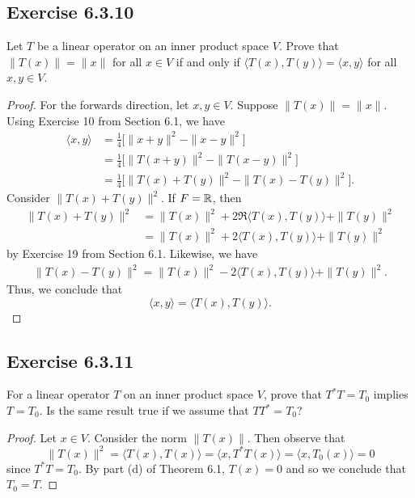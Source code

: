 \subsection*{Exercise 6.3.10} Let \(T  \) be a linear operator on an inner product space \( V  \). Prove that \( \|T(x)\| = \|x\| \) for all \( x \in V  \) if and only if \( \langle T(x) , T(y) \rangle = \langle x , y \rangle \) for all \( x,y \in  V \).
\begin{proof}
For the forwards direction, let \( x,y \in V  \). Suppose \( \|T(x)\| = \|x\| \). Using Exercise 10 from Section 6.1, we have  
\begin{align*}
    \langle x , y \rangle &= \frac{ 1 }{ 4 } \Big[ \|x + y\|^{2} - \|x-y\|^{2} \Big]   \\
                          &= \frac{ 1 }{ 4 } \Big[ \|T(x+y)\|^{2} - \|T(x-y)\|^{2} \Big]  \\
                          &= \frac{ 1 }{ 4 }  \Big[ \|T(x) + T(y)\|^{2} - \|T(x) - T(y)\|^{2} \Big].
\end{align*}
Consider \( \|T(x) + T(y)\|^{2} \). If \( F = \mathbb{R}  \), then
\begin{align*}
    \|T(x) + T(y)\|^{2} &= \|T(x)\|^{2} + 2 \Re \langle T(x) , T(y) \rangle + \|T(y)\|^{2} \\
                        &= \|T(x)\|^{2} + 2 \langle T(x) , T(y) \rangle + \|T(y)\|^{2}
\end{align*}
by Exercise 19 from Section 6.1.
Likewise, we have
\begin{align*}
    \|T(x) - T(y)\|^{2} = \|T(x)\|^{2} - 2 \langle T(x) , T(y)  \rangle + \|T(y)\|^{2}. 
\end{align*}
Thus, we conclude that 
\[  \langle x , y \rangle =  \langle T(x) , T(y) \rangle. \]

\end{proof}

\subsection*{Exercise 6.3.11} For a linear operator \( T  \) on an inner product space \( V  \), prove that \( T^{*}T = {T}_{0} \) implies \( T = {T}_{0} \). Is the same result true if we assume that \( T T^{*} = {T}_{0} \)?
\begin{proof}
Let \( x \in V  \). Consider the norm \(  \|T(x)\| \). Then observe that
\[  \|T(x)\|^{2} = \langle T(x) , T(x) \rangle = \langle x  , T^{*} T(x) \rangle = \langle x  ,  {T}_{0}(x) \rangle = 0  \]
since \( T^{*} T = {T}_{0} \). By part (d) of Theorem 6.1, \( T(x) = 0  \) and so we conclude that \( {T}_{0} = T   \).
\end{proof}

